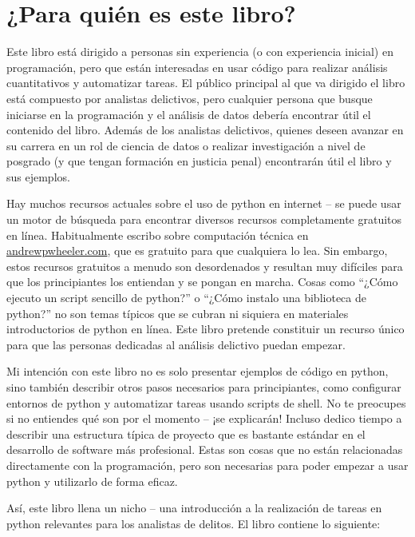 \documentclass[
  letterpaper,
]{scrbook}
\begin{document}
\section*{¿Para quién es este libro?}\label{para-quiuxe9n-es-este-libro}


Este libro está dirigido a personas sin experiencia (o con experiencia
inicial) en programación, pero que están interesadas en usar código para
realizar análisis cuantitativos y automatizar tareas. El público
principal al que va dirigido el libro está compuesto por analistas
delictivos, pero cualquier persona que busque iniciarse en la
programación y el análisis de datos debería encontrar útil el contenido
del libro. Además de los analistas delictivos, quienes deseen avanzar en
su carrera en un rol de ciencia de datos o realizar investigación a
nivel de posgrado (y que tengan formación en justicia penal) encontrarán
útil el libro y sus ejemplos.

Hay muchos recursos actuales sobre el uso de python en internet -- se
puede usar un motor de búsqueda para encontrar diversos recursos
completamente gratuitos en línea. Habitualmente escribo sobre
computación técnica en
\href{https://andrewpwheeler.com/}{andrewpwheeler.com}, que es gratuito
para que cualquiera lo lea. Sin embargo, estos recursos gratuitos a
menudo son desordenados y resultan muy difíciles para que los
principiantes los entiendan y se pongan en marcha. Cosas como ``¿Cómo
ejecuto un script sencillo de python?'' o ``¿Cómo instalo una biblioteca
de python?'' no son temas típicos que se cubran ni siquiera en
materiales introductorios de python en línea. Este libro pretende
constituir un recurso único para que las personas dedicadas al análisis
delictivo puedan empezar.

Mi intención con este libro no es solo presentar ejemplos de código en
python, sino también describir otros pasos necesarios para
principiantes, como configurar entornos de python y automatizar tareas
usando scripts de shell. No te preocupes si no entiendes qué son por el
momento -- ¡se explicarán! Incluso dedico tiempo a describir una
estructura típica de proyecto que es bastante estándar en el desarrollo
de software más profesional. Estas son cosas que no están relacionadas
directamente con la programación, pero son necesarias para poder empezar
a usar python y utilizarlo de forma eficaz.

Así, este libro llena un nicho -- una introducción a la realización de
tareas en python relevantes para los analistas de delitos. El libro
contiene lo siguiente:
\end{document}
